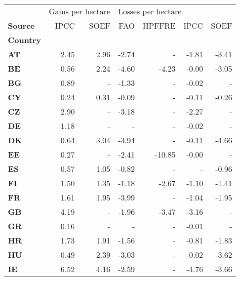 \begin{tabular}{lrr|rrrr}
\toprule
{} & \multicolumn{2}{l}{Gains per hectare} & \multicolumn{4}{l}{Losses per hectare} \\
\textbf{Source} &              IPCC & SOEF &                FAO & HPFFRE &  IPCC &  SOEF \\
\textbf{Country} &                   &      &                    &        &       &       \\
\midrule
\textbf{AT     } &              2.45 & 2.96 &              -2.74 &      - & -1.81 & -3.41 \\
\textbf{BE     } &              0.56 & 2.24 &              -4.60 &  -4.23 & -0.00 & -3.05 \\
\textbf{BG     } &              0.89 &    - &              -1.33 &      - & -0.02 &     - \\
\textbf{CY     } &              0.24 & 0.31 &              -0.09 &      - & -0.11 & -0.26 \\
\textbf{CZ     } &              2.90 &    - &              -3.18 &      - & -2.27 &     - \\
\textbf{DE     } &              1.18 &    - &                  - &      - & -0.02 &     - \\
\textbf{DK     } &              0.64 & 3.04 &              -3.94 &      - & -0.11 & -4.66 \\
\textbf{EE     } &              0.27 &    - &              -2.41 & -10.85 & -0.00 &     - \\
\textbf{ES     } &              0.57 & 1.05 &              -0.82 &      - &     - & -0.96 \\
\textbf{FI     } &              1.50 & 1.35 &              -1.18 &  -2.67 & -1.10 & -1.41 \\
\textbf{FR     } &              1.61 & 1.95 &              -3.99 &      - & -1.04 & -1.95 \\
\textbf{GB     } &              4.19 &    - &              -1.96 &  -3.47 & -3.16 &     - \\
\textbf{GR     } &              0.16 &    - &                  - &      - & -0.01 &     - \\
\textbf{HR     } &              1.73 & 1.91 &              -1.56 &      - & -0.81 & -1.83 \\
\textbf{HU     } &              0.49 & 2.39 &              -3.03 &      - & -0.02 & -3.62 \\
\textbf{IE     } &              6.52 & 4.16 &              -2.59 &      - & -4.76 & -3.66 \\

\end{tabular}
